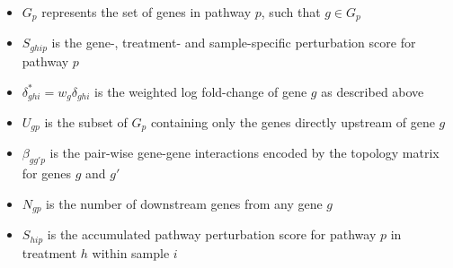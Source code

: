 \documentclass[9pt,a4paper,]{extarticle}
\begin{document}
\begin{itemize}
\item
  \(G_p\) represents the set of genes in pathway \(p\), such that \(g \in G_p\)
\item
  \(S_{ghip}\) is the gene-, treatment- and sample-specific perturbation score for pathway \(p\)
\item
  \(\delta_{ghi}^* = w_g\delta_{ghi}\) is the weighted log fold-change of gene \(g\) as described above
\item
  \(U_{gp}\) is the subset of \(G_p\) containing only the genes directly upstream of gene \(g\)
\item
  \(\beta_{gg'p}\) is the pair-wise gene-gene interactions\citep{Tarca2009} encoded by the topology matrix for genes \(g\) and \(g'\)
\item
  \(N_{gp}\) is the number of downstream genes from any gene \(g\)
\item
  \(S_{hip}\) is the accumulated pathway perturbation score for pathway \(p\) in treatment \(h\) within sample \(i\)
\end{itemize}
\end{document}
